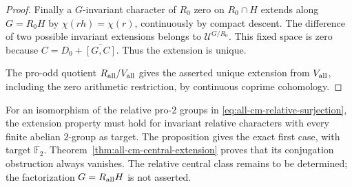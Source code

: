 \begin{proof}
Finally a \(G\)-invariant character of \(R_0\)
zero on \(R_0\cap H\) extends along \(G=R_0H\)
by \(\chi(rh)=\chi(r)\), continuously by compact
descent. The difference of two possible invariant
extensions belongs to \(\mathscr U^{G/R_0}\).
This fixed space is zero because
\(C=D_0+\overline{[G,C]}\).
Thus the extension is unique.

The pro-odd quotient
\(R_{\rm all}/V_{\rm all}\) gives the asserted
unique extension from \(V_{\rm all}\), including
the zero arithmetic restriction, by continuous
coprime cohomology.
\end{proof}

For an isomorphism of the relative pro-\(2\) groups
in \eqref{eq:all-cm-relative-surjection}, the extension
property must hold for invariant relative characters
with every finite abelian \(2\)-group as target.
The proposition gives the exact first case, with
target \(\mathbb F_2\). Theorem~\ref{thm:all-cm-central-extension}
proves that its conjugation obstruction always vanishes.
The relative central class remains to be determined;
the factorization \(G=R_{\rm all}H\) is not asserted.
